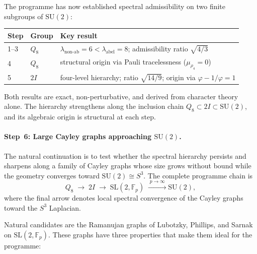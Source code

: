 \documentclass[11pt,a4paper]{article}
\begin{document}
    The programme has now established spectral admissibility on two finite
    subgroups of $\mathrm{SU}(2)$:
    \begin{center}
      \renewcommand{\arraystretch}{1.2}
      \begin{tabular}{lll}
        \hline
        Step & Group & Key result \\
        \hline
        1--3 & $Q_8$ & $\lambda_{\text{non-ab}} = 6 < \lambda_{\text{abel}} = 8$;
        admissibility ratio $\sqrt{4/3}$ \\
        4 & $Q_8$ & structural origin via Pauli tracelessness
        ($\mu_{\rho_4} = 0$) \\
        5 & $2I$ & four-level hierarchy; ratio $\sqrt{14/9}$;
        origin via $\varphi - 1/\varphi = 1$ \\
        \hline
      \end{tabular}
    \end{center}

    Both results are exact, non-perturbative, and derived from character
    theory alone.
    The hierarchy strengthens along the inclusion chain
    $Q_8 \subset 2I \subset \mathrm{SU}(2)$, and its algebraic origin is
    structural at each step.

    \paragraph{Step~6: Large Cayley graphs approaching $\mathrm{SU}(2)$.}

      The natural continuation is to test whether the spectral hierarchy
      persists and sharpens along a family of Cayley graphs whose size grows
      without bound while the geometry converges toward
      $\mathrm{SU}(2) \cong S^3$.
      The complete programme chain is
      \begin{equation}
        Q_8
        \;\longrightarrow\;
        2I
        \;\longrightarrow\;
        \mathrm{SL}(2,\mathbb{F}_p)
        \;\xrightarrow{\;p \to \infty\;}
        \mathrm{SU}(2),
        \label{eq:chain-full}
      \end{equation}
      where the final arrow denotes local spectral convergence of the Cayley
      graphs toward the $S^3$ Laplacian.

      Natural candidates are the Ramanujan graphs of Lubotzky, Phillips, and
      Sarnak~\cite{LPS1988} on $\mathrm{SL}(2,\mathbb{F}_p)$.
      These graphs have three properties that make them ideal for the
      programme:
\end{document}
